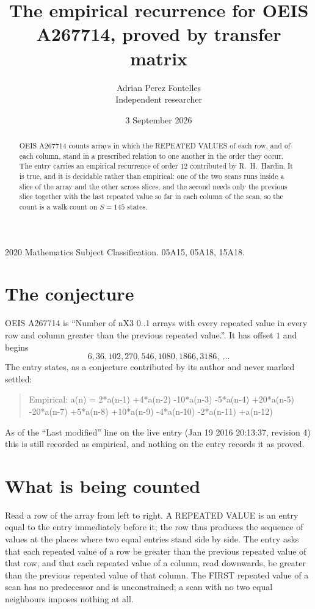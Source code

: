 \documentclass[11pt,a4paper]{article}
\title{The empirical recurrence for OEIS A267714, proved by transfer matrix}
\author{Adrian Perez Fontelles\\ \small Independent researcher}
\date{3 September 2026}
\theoremstyle{plain}
\theoremstyle{definition}
\begin{document}
\maketitle

\begin{abstract}
OEIS A267714 counts arrays in which the REPEATED VALUES of each row, and of each column, stand in a
prescribed relation to one another in the order they occur. The entry carries an empirical
recurrence of order $12$ contributed by R.~H.~Hardin. It is true, and it is decidable
rather than empirical: one of the two scans runs inside a slice of the array and the other
across slices, and the second needs only the previous slice together with the last repeated
value so far in each column of the scan, so the count is a walk count on $S=145$ states.
\end{abstract}

\noindent\small 2020 Mathematics Subject Classification. 05A15, 05A18, 15A18.\normalsize

\section{The conjecture}

OEIS A267714 is ``Number of nX3 0..1 arrays with every repeated value in every row and column greater than the previous repeated value.''. It has offset $1$ and begins
\[
6, 36, 102, 270, 546, 1080, 1866, 3186,\ \dots
\]
The entry states, as a conjecture contributed by its author and never marked settled:
\begin{quote}
Empirical: a(n) = 2*a(n-1) +4*a(n-2) -10*a(n-3) -5*a(n-4) +20*a(n-5) -20*a(n-7) +5*a(n-8) +10*a(n-9) -4*a(n-10) -2*a(n-11) +a(n-12)
\end{quote}
As of the ``Last modified'' line on the live entry (Jan 19 2016 20:13:37, revision 4) this is still
recorded as empirical, and nothing on the entry records it as proved.

\section{What is being counted}

Read a row of the array from left to right. A REPEATED VALUE is an entry equal to the entry
immediately before it; the row thus produces the sequence of values at the places where two
equal entries stand side by side. The entry asks that each repeated value of a row be
greater than the previous repeated value of that row, and that each repeated value of a column,
read downwards, be greater than the previous repeated value of that column. The FIRST repeated
value of a scan has no predecessor and is unconstrained; a scan with no two equal neighbours
imposes nothing at all.
\end{document}
